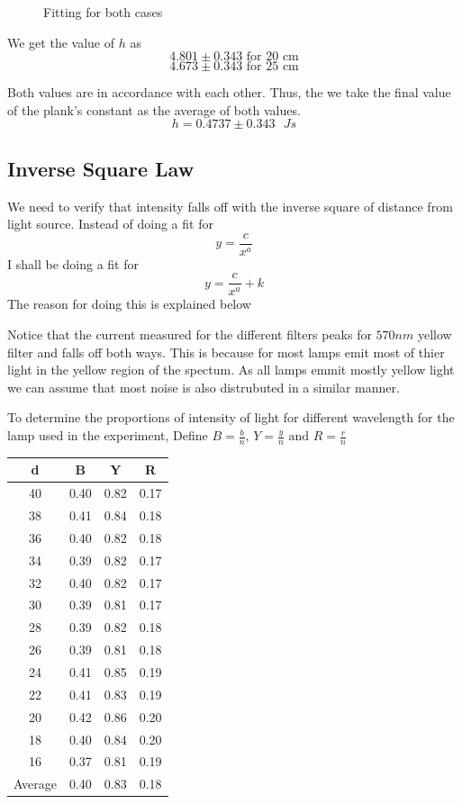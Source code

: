 \documentclass[12pt]{article}
\newlength\fwidth
\newlength\fheight
\begin{document}
\begin{figure}[!ht]
    \centering
    \caption{Fitting for both cases}
    \setlength{}
    \setlength{}
    
    
\end{figure}
We get the value of $h$ as
\[4.801 \pm 0.343 \text{ for 20 cm}\]
\[4.673 \pm 0.343 \text{ for 25 cm}\]

Both values are in accordance with each other.
Thus, the we take the final value of the plank's constant as the average of both values.
\[h = 0.4737 \pm 0.343\text{ }Js\]
\subsection*{Inverse Square Law}
We need to verify that intensity falls off with the inverse square of distance from light source.
Instead of doing a fit for 
$$\displaystyle y = \frac{c}{x^a}$$
I shall be doing a fit for 
$$\displaystyle y = \frac{c}{x^a}+k$$
The reason for doing this is explained below

Notice that the current measured for the different filters peaks for $570 nm$ yellow filter and falls off both ways.
This is because for most lamps emit most of thier light in the yellow region of the spectum.
As all lamps emmit mostly yellow light we can assume that most noise is also distrubuted in  a similar manner.

To determine the proportions of intensity of light for different wavelength for the lamp used in the experiment,
Define $\displaystyle B = \frac{b}{n} \text{, }Y = \frac{y}{n} \text{ and } R = \frac{r}{n}$

\begin{table}[!ht]
    \centering
    \begin{tabular}{|c|c|c|c|}
    \hline
        d & B & Y & R \\ \hline
        40 & 0.40 & 0.82 & 0.17 \\ \hline
        38 & 0.41 & 0.84 & 0.18 \\ \hline
        36 & 0.40 & 0.82 & 0.18 \\ \hline
        34 & 0.39 & 0.82 & 0.17 \\ \hline
        32 & 0.40 & 0.82 & 0.17 \\ \hline
        30 & 0.39 & 0.81 & 0.17 \\ \hline
        28 & 0.39 & 0.82 & 0.18 \\ \hline
        26 & 0.39 & 0.81 & 0.18 \\ \hline
        24 & 0.41 & 0.85 & 0.19 \\ \hline
        22 & 0.41 & 0.83 & 0.19 \\ \hline
        20 & 0.42 & 0.86 & 0.20 \\ \hline
        18 & 0.40 & 0.84 & 0.20 \\ \hline
        16 & 0.37 & 0.81 & 0.19 \\ \hline
        Average & 0.40 & 0.83 & 0.18\\  \hline
    \end{tabular}
\end{table}
\end{document}
